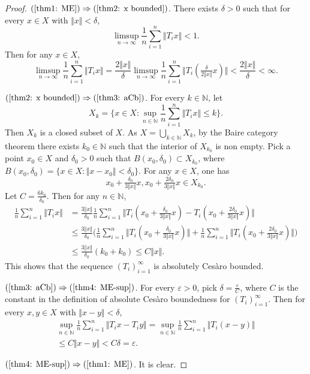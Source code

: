 \documentclass[12pt,a4paper]{amsart}
\theoremstyle{definition}
\theoremstyle{plain}
\begin{document}
\begin{proof}
     $ (\ref{thm1: ME})\Rightarrow (\ref{thm2: x bounded})$.  There exists $\delta>0$ such that for every $x\in X$ with $\Vert x\Vert<\delta$,
  \[
        \limsup_{n\to\infty}\frac{1}{n}\sum_{i=1}^{n}\Vert T_ix\Vert<1.
    \]
    Then for any $x\in X$,
    \[
        \limsup_{n\to\infty}\frac{1}{n}\sum_{i=1}^{n}\Vert T_ix\Vert = \frac{2\Vert x\Vert}{\delta}
        \limsup_{n\to\infty}\frac{1}{n}\sum_{i=1}^{n}\Vert T_i(\tfrac{\delta}{2\Vert x\Vert}x)\Vert < \frac{2\Vert x\Vert}{\delta}<\infty.
    \]
  
     $(\ref{thm2: x bounded}) \Rightarrow (\ref{thm3: aCb})$.
     For every $k\in\mathbb{N}$, let
    \[
        X_k=\biggl\{x\in X\colon  \sup_{n\in\mathbb{N}}\frac{1}{n}\sum_{i=1}^{n}\Vert T_i x\Vert\leq k\biggr\}.
    \]
    Then $X_k$ is a closed subset of $X$.
    As $X=\bigcup_{k\in \mathbb{N}} X_k$, by the Baire category theorem
    there exists $k_0\in\mathbb{N}$ such that the interior of $X_{k_0}$ is non empty.
    Pick a point $x_0\in X$ and $\delta_0>0$ such that $B(x_0,\delta_0)\subset X_{k_0}$, where
    $B(x_0,\delta_0)=\{x\in X\colon \Vert x-x_0\Vert<\delta_0\}$.
    For any $x\in X$, one has
    \[
        x_0+ \tfrac{\delta_0}{3\Vert x\Vert} x, x_0+ \tfrac{2\delta_0}{3\Vert x\Vert} x \in X_{k_0}.
    \]
    Let $C=\frac{6k_0}{\delta_0}$.
    Then for any $n\in\mathbb{N}$,
    \begin{align*}
        \frac{1}{n}
        \sum_{i=1}^{n}\Vert T_i x\Vert & =
        \frac{3\Vert x\Vert}{\delta_0}\frac{1}{n} \sum_{i=1}^{n}\Vert T_i (x_0+ \tfrac{\delta_0}{3\Vert x\Vert} x) - T_i (x_0+ \tfrac{2\delta_0}{3\Vert x\Vert} x)\Vert
        \\
         & \leq \frac{3\Vert x\Vert}{\delta_0}
        \biggl(\frac{1}{n}\sum_{i=1}^{n}\Vert T_i (x_0+ \tfrac{\delta_0}{3\Vert x\Vert} x)\Vert
        +\frac{1}{n}\sum_{i=1}^{n}\Vert T_i (x_0+ \tfrac{2\delta_0}{3\Vert x\Vert} x)\Vert\biggr) \\
        & \leq \frac{3\Vert x\Vert}{\delta_0}(k_0+k_0)
        \leq C \Vert x\Vert.
    \end{align*}
    This shows that the sequence $(T_i)_{i=1}^{\infty}$ is absolutely Ces\`aro bounded.

     $ (\ref{thm3: aCb} )  \Rightarrow   (\ref{thm4: ME-sup})$.  For every $\varepsilon>0$, pick $\delta=\frac{\varepsilon}{C}$, where $C$ is the constant in the definition of absolute Ces\`aro boundedness for $(T_i)_{i=1}^{\infty}$. Then for every $x,y\in X$ with $\Vert x-y\Vert<\delta$,
    \begin{align*}
        \sup_{n\in\mathbb{N}}\frac{1}{n}\sum_{i=1}^{n}\Vert T_ix-T_iy\Vert =
        \sup_{n\in\mathbb{N}}\frac{1}{n}\sum_{i=1}^{n}\Vert T_i(x-y)\Vert \\
        \leq C \Vert x-y\Vert <C\delta=\varepsilon.
    \end{align*}

     $ (\ref{thm4: ME-sup})  \Rightarrow (\ref{thm1: ME}) $.  
     It is clear.
\end{proof}
\end{document}
